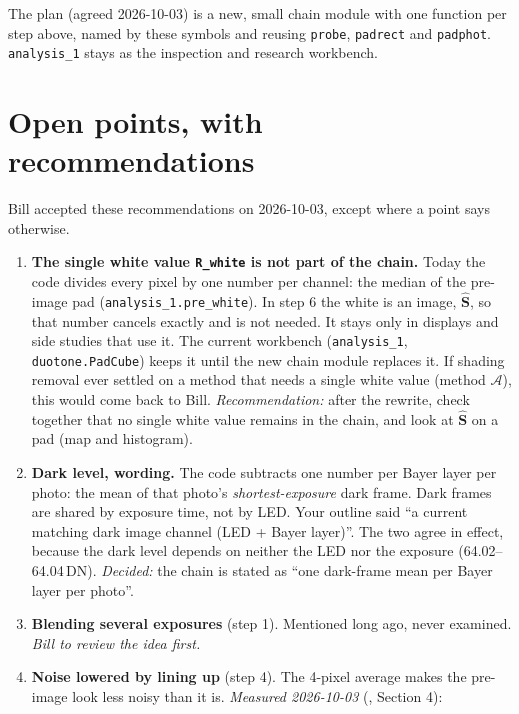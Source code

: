 \documentclass[11pt,letter]{article}
\newcommand{\file}[1]{\texttt{\seqsplit{#1}}}
\newcommand{\code}[1]{\texttt{#1}}
\newcommand{\hS}{\widehat{\mathbf{S}}}     %
\newcommand{\MA}{\mathcal{A}}
\begin{document}
\medskip
\noindent The plan (agreed 2026-10-03) is a new, small chain module with one
function per step above, named by these symbols and reusing \code{probe},
\code{padrect} and \code{padphot}.  \code{analysis\_1} stays as the
inspection and research workbench.

\section{Open points, with recommendations}
\label{sec:open}

\noindent Bill accepted these recommendations on 2026-10-03, except where a
point says otherwise.

\begin{enumerate}[leftmargin=1.5em]
  \item \textbf{The single white value \code{R\_white} is not part of the
    chain.}  Today the code divides every pixel by one number per channel:
    the median of the pre-image pad (\code{analysis\_1.pre\_white}).  In
    step 6 the white is an image, $\hS$, so that number cancels exactly and
    is not needed.  It stays only in displays and side studies that use it.
    The current workbench (\code{analysis\_1}, \code{duotone.PadCube}) keeps
    it until the new chain module replaces it.  If shading removal ever
    settled on a method that needs a single white value (method $\MA$),
    this would come back to Bill.  \emph{Recommendation:} after the rewrite,
    check together that no single white value remains in the chain, and
    look at $\hS$ on a pad (map and histogram).
  \item \textbf{Dark level, wording.}  The code subtracts one number per
    Bayer layer per photo: the mean of that photo's \emph{shortest-exposure}
    dark frame.  Dark frames are shared by exposure time, not by LED.  Your
    outline said ``a current matching dark image channel (LED + Bayer
    layer)''.  The two agree in effect, because the dark level depends on
    neither the LED nor the exposure (64.02--64.04\,DN).
    \emph{Decided:} the chain is stated as ``one dark-frame mean per Bayer
    layer per photo''.
  \item \textbf{Blending several exposures} (step 1).  Mentioned long ago,
    never examined.  \emph{Bill to review the idea first.}
  \item \textbf{Noise lowered by lining up} (step 4).  The 4-pixel average
    makes the pre-image look less noisy than it is.
    \emph{Measured 2026-10-03} (\file{shading\_removal.tex}, Section 4):

\end{enumerate}
\end{document}
